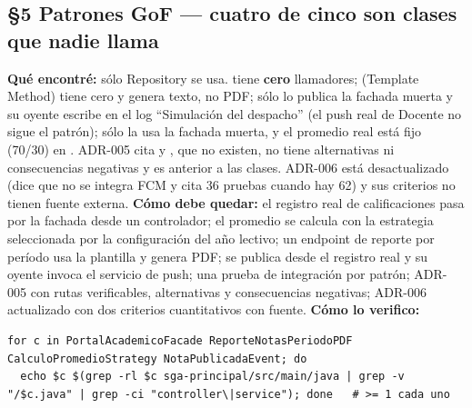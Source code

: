 \subsection*{\S5 Patrones GoF --- cuatro de cinco son clases que nadie llama}
\textbf{Qu\'e encontr\'e:} s\'olo Repository se usa.  tiene \textbf{cero} llamadores;  (Template Method) tiene cero y genera texto, no PDF;  s\'olo lo publica la fachada muerta y su oyente escribe en el log ``Simulaci\'on del despacho'' (el push real de Docente no sigue el patr\'on);  s\'olo la usa la fachada muerta, y el promedio real est\'a fijo (70/30) en . ADR-005 cita  y , que no existen, no tiene alternativas ni consecuencias negativas y es anterior a las clases. ADR-006 est\'a desactualizado (dice que no se integra FCM y cita 36 pruebas cuando hay 62) y sus criterios no tienen fuente externa. \textbf{C\'omo debe quedar:} el registro real de calificaciones pasa por la fachada desde un controlador; el promedio se calcula con la estrategia seleccionada por la configuraci\'on del a\~no lectivo; un endpoint de reporte por per\'iodo usa la plantilla y genera PDF;  se publica desde el registro real y su oyente invoca el servicio de push; una prueba de integraci\'on por patr\'on; ADR-005 con rutas verificables, alternativas y consecuencias negativas; ADR-006 actualizado con dos criterios cuantitativos con fuente. \textbf{C\'omo lo verifico:}\begin{verbatim}
for c in PortalAcademicoFacade ReporteNotasPeriodoPDF CalculoPromedioStrategy NotaPublicadaEvent; do
  echo $c $(grep -rl $c sga-principal/src/main/java | grep -v "/$c.java" | grep -ci "controller\|service"); done   # >= 1 cada uno
\end{verbatim}

